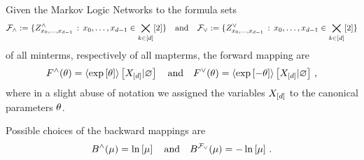 \begin{theorem}
    Given the Markov Logic Networks to the formula sets
    \[ \mathcal{F}_{\land} := \{ Z^{\land}_{{x_{0},\ldots,x_{d-1}}} \, : \, {x_{0},\ldots,x_{d-1}}\in\bigtimes_{k\in[d]}[2]\} \quad \text{and} \quad
    \mathcal{F}_{\lor} := \{ Z^{\lor}_{{x_{0},\ldots,x_{d-1}}} \, : \, {x_{0},\ldots,x_{d-1}}\in\bigtimes_{k\in[d]}[2]\}  \]
    of all minterms, respectively of all mapterms, the forward mapping are
    \[ F^{\land}(\theta) = \left\langle \mathrm{exp}\left[\theta\right]\right\rangle \left[ X_{[d]} | \varnothing \right]
    \quad \text{and} \quad
    F^{\lor}(\theta) = \left\langle \mathrm{exp}\left[-\theta\right]\right\rangle \left[ X_{[d]} | \varnothing \right] \, , \]
    where in a slight abuse of notation we assigned the variables $X_{[d]}$ to the canonical parameters $\theta$.

    Possible choices of the backward mappings are
    \[ B^{\land}(\mu) = \ln \left[ \mu \right]
    \quad \text{and} \quad
    B^{\mathcal{F}_{\lor}}(\mu) = -\ln \left[ \mu \right] \, .
    \]
\end{theorem}
